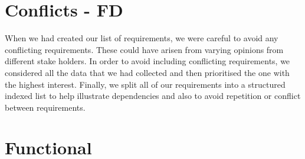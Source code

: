 \documentclass[12pt]{report}
\begin{document}
\section{Conflicts - FD}

When we had created our list of requirements, we were careful to avoid any conflicting requirements. These could have arisen from varying opinions from different stake holders. In order to avoid including conflicting requirements, we considered all the data that we had collected and then prioritised the one with the highest interest. Finally, we split all of our requirements into a structured indexed list to help illustrate dependencies and also to avoid repetition or conflict between requirements.

\section{Functional}
\end{document}
